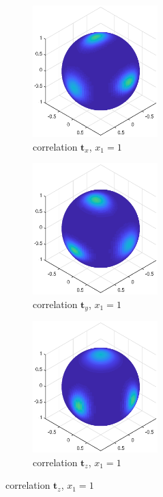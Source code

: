 \documentclass[12pt]{article}
\begin{document}
\begin{figure}
	\begin{subfigure}{0.3\textwidth}
		\centering
		\includegraphics[height=2in]{x1}
		\caption{correlation $\bm{t}_x$, $x_1=1$}
	\end{subfigure}
	\begin{subfigure}{0.3\textwidth}
		\centering
		\includegraphics[height=2in]{y1}
		\caption{correlation $\bm{t}_y$, $x_1=1$}
	\end{subfigure}
	\begin{subfigure}{0.3\textwidth}
		\centering
		\includegraphics[height=2in]{z1}
		\caption{correlation $\bm{t}_z$, $x_1=1$}
	\end{subfigure}
	

\end{figure}
\end{document}
